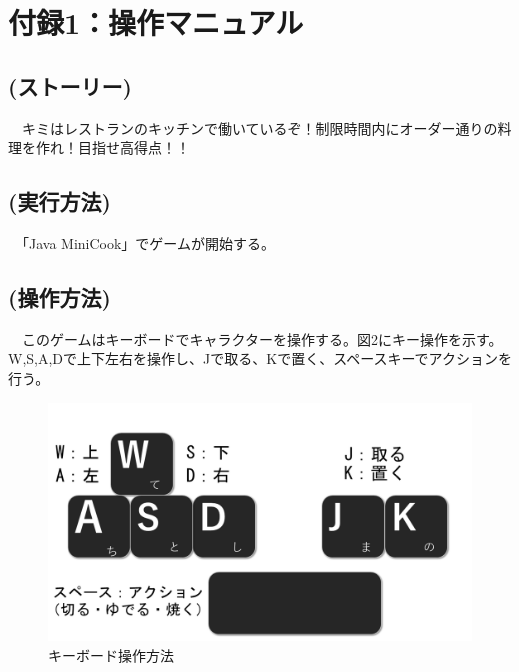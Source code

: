 \documentclass[a4j]{jarticle} %
\begin{document}
\newpage
\section*{付録1：操作マニュアル}
\subsection*{(ストーリー)}
　キミはレストランのキッチンで働いているぞ！制限時間内にオーダー通りの料理を作れ！目指せ高得点！！
\subsection*{(実行方法)}
　「Java MiniCook」でゲームが開始する。
\subsection*{(操作方法)}
　このゲームはキーボードでキャラクターを操作する。図2にキー操作を示す。W,S,A,Dで上下左右を操作し、Jで取る、Kで置く、スペースキーでアクションを行う。
\begin{figure}[H]
  \begin{center}
  \includegraphics[scale=0.2]{img/key.png}
  \caption{キーボード操作方法}
  \end{center}
\end{figure}
\end{document}
